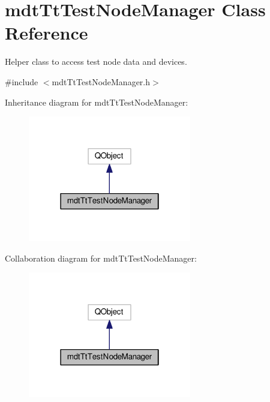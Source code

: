 \hypertarget{classmdt_tt_test_node_manager}{\section{mdt\-Tt\-Test\-Node\-Manager Class Reference}
\label{classmdt_tt_test_node_manager}
}


Helper class to access test node data and devices.  




{\ttfamily \#include $<$mdt\-Tt\-Test\-Node\-Manager.\-h$>$}



Inheritance diagram for mdt\-Tt\-Test\-Node\-Manager\-:\nopagebreak
\begin{figure}[H]
\begin{center}
\leavevmode
\includegraphics[width=202pt]{classmdt_tt_test_node_manager__inherit__graph}
\end{center}
\end{figure}


Collaboration diagram for mdt\-Tt\-Test\-Node\-Manager\-:\nopagebreak
\begin{figure}[H]
\begin{center}
\leavevmode
\includegraphics[width=202pt]{classmdt_tt_test_node_manager__coll__graph}
\end{center}
\end{figure}
